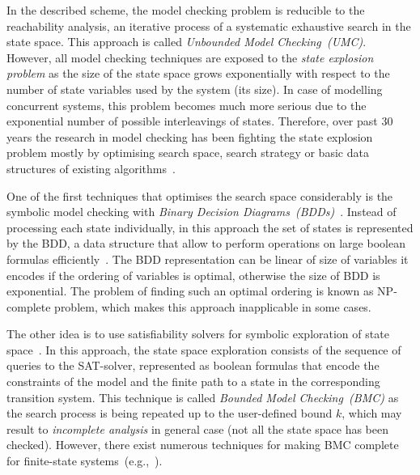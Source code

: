 In the described scheme, the model checking problem is reducible to the reachability analysis, an iterative process of a systematic exhaustive search in the state space.
This approach is called \textit{Unbounded Model Checking~(UMC)}.
However, all model checking techniques are exposed to the \textit{state explosion problem} as the size of the state space grows exponentially with respect to the number of state variables used by the system (its size).
In case of modelling concurrent systems, this problem becomes much more serious due to the exponential number of possible interleavings of states.
Therefore, over past 30 years the research in model checking has been fighting the state explosion problem mostly by optimising search space, search strategy or basic data structures of existing algorithms~\cite{clarke2001progress}.

One of the first techniques that optimises the search space considerably is the symbolic model checking with \textit{Binary Decision Diagrams~(BDDs)}~\cite{burch1992symbolic}.
Instead of processing each state individually, in this approach the set of states is represented by the BDD, a data structure that allow to perform operations on large boolean formulas efficiently~\cite{clarke2012model}.
The BDD representation can be linear of size of variables it encodes if the ordering of variables is optimal, otherwise the size of BDD is exponential.
The problem of finding such an optimal ordering is known as NP-complete problem, which makes this approach inapplicable in some cases.

The other idea is to use satisfiability solvers for symbolic exploration of state space~\cite{clarke2001bounded}.
In this approach, the state space exploration consists of the sequence of queries to the SAT-solver, represented as boolean formulas that encode the constraints of the model and the finite path to a state in the corresponding transition system.
This technique is called \textit{Bounded Model Checking~(BMC)} as the search process is being repeated up to the user-defined bound $k$, which may result to \textit{incomplete analysis} in general case (not all the state space has been checked).
However, there exist numerous techniques for making BMC complete for finite-state systems~(e.g.,~\cite{shtrichman2000tuning}).

